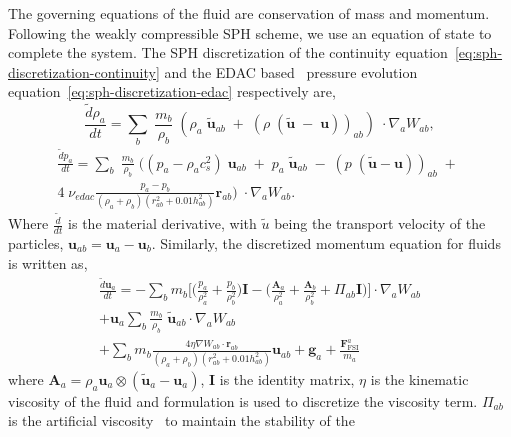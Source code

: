 \documentclass[10pt, conference]{FMFP2022}
\newcommand{\ten}[1]{\ensuremath{\mathbf{#1}}}
\begin{document}
The governing equations of the fluid are conservation of mass and momentum.
Following the weakly compressible SPH scheme, we use an equation of state to
complete the system. The SPH discretization of the continuity
equation~\eqref{eq:sph-discretization-continuity} and the EDAC
based~\cite{PRKP:edac-sph-iccm2015} pressure evolution
equation~\eqref{eq:sph-discretization-edac} respectively are,
\begin{equation}
  \label{eq:sph-discretization-continuity}
  \frac{\tilde{d}\rho_a}{dt} = \sum_{b} \; \frac{m_b}{\rho_{b}} \; (
  \rho_{a} \; \tilde{\ten{u}}_{ab} \; + \;
  (\rho \; (\tilde{\ten{u}} \; - \;
  \ten{u}))_{ab}) \; \cdot \nabla_{a} W_{ab},
\end{equation}
\begin{multline}
  \label{eq:sph-discretization-edac}
  \frac{\tilde{d}p_a}{dt} = \sum_{b} \; \frac{m_b}{\rho_{b}} \; \bigg(
  (p_{a} - \rho_{a} c_{s}^2) \; \ten{u}_{ab} \; + \;
  p_{a} \; \tilde{\ten{u}}_{ab} \; - \;
  (p \; (\tilde{\ten{u}} - \ten{u}))_{ab} \; + \; \\
  4 \; \nu_{edac}
  \frac{p_a - p_b}{(\rho_a + \rho_b) (r^2_{ab} + 0.01 h_{ab}^{2})} \ten{r}_{ab}
  \bigg) \; \cdot \nabla_{a} W_{ab}.
\end{multline}
%
Where $\frac{\tilde{d}}{dt}$ is the material derivative, with $\tilde{u}$ being
the transport velocity of the particles, $\ten{u}_{ab} = \ten{u}_a - \ten{u}_b$.
%
Similarly, the discretized momentum equation for fluids is written as,
\begin{multline}
  \label{eq:sph-momentum-fluid}
  \frac{\tilde{d}\ten{u}_{a}}{dt} = - \sum_{b} m_b \bigg[
  \bigg(\frac{p_a}{\rho_a^2} + \frac{p_b}{\rho_b^2}\bigg) \ten{I} -
  \bigg(\frac{\ten{A}_a}{\rho_a^2} + \frac{\ten{A}_b}{\rho_b^2} + \Pi_{ab}
  \ten{I} \bigg) \bigg]
  \cdot \nabla_{a} W_{ab} \\
  + \ten{u}_{a} \sum_{b} \frac{m_b}{\rho_{b}} \; \tilde{\ten{u}}_{ab} \cdot
  \nabla_{a} W_{ab} \\+ \sum_{b} m_b \frac{4 \eta \nabla W_{ab}\cdot
    \ten{r}_{ab}}{(\rho_a + \rho_b) (r_{ab}^2 + 0.01 h_{ab}^2)} \ten{u}_{ab} +
  \ten{g}_{a} + \frac{\ten{F}^a_{\text{FSI}}}{m_a}
\end{multline}
where $\ten{A}_a = \rho_a \ten{u}_a \otimes (\ten{\tilde{u}}_a - \ten{u}_a)$,
$\ten{I}$ is the identity matrix, $\eta$ is the kinematic viscosity of the
fluid and \cite{morris-lowRe-97} formulation is used to discretize the
viscosity term. $\Pi_{ab}$ is the artificial
viscosity~\cite{monaghan-review:2005} to maintain the stability of the
\end{document}
